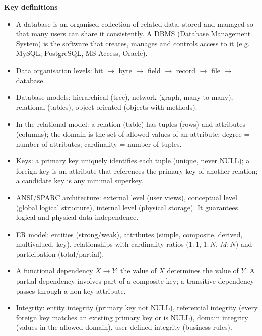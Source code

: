 \documentclass[11pt]{article}
\newcommand{\cle}[1]{{\popxbold\color{popdark}#1}}
\begin{document}
\begin{bilan}
\textbf{Key definitions}
\begin{itemize}
\item A \cle{database} is an organised collection of related data, stored and managed so that many users can share it consistently. A \cle{DBMS} (Database Management System) is the software that creates, manages and controls access to it (e.g. MySQL, PostgreSQL, MS Access, Oracle).
\item Data organisation levels: \cle{bit} $\rightarrow$ \cle{byte} $\rightarrow$ \cle{field} $\rightarrow$ \cle{record} $\rightarrow$ \cle{file} $\rightarrow$ \cle{database}.
\item Database models: \cle{hierarchical} (tree), \cle{network} (graph, many-to-many), \cle{relational} (tables), \cle{object-oriented} (objects with methods).
\item In the \cle{relational model}: a \cle{relation} (table) has \cle{tuples} (rows) and \cle{attributes} (columns); the \cle{domain} is the set of allowed values of an attribute; \cle{degree} = number of attributes; \cle{cardinality} = number of tuples.
\item Keys: a \cle{primary key} uniquely identifies each tuple (unique, never NULL); a \cle{foreign key} is an attribute that references the primary key of another relation; a \cle{candidate key} is any minimal superkey.
\item \cle{ANSI/SPARC architecture}: \cle{external level} (user views), \cle{conceptual level} (global logical structure), \cle{internal level} (physical storage). It guarantees \cle{logical} and \cle{physical data independence}.
\item \cle{ER model}: entities (strong/weak), attributes (simple, composite, derived, multivalued, key), relationships with cardinality ratios ($1{:}1$, $1{:}N$, $M{:}N$) and participation (total/partial).
\item A \cle{functional dependency} $X \rightarrow Y$: the value of $X$ determines the value of $Y$. A \cle{partial dependency} involves part of a composite key; a \cle{transitive dependency} passes through a non-key attribute.
\item \cle{Integrity}: \cle{entity integrity} (primary key not NULL), \cle{referential integrity} (every foreign key matches an existing primary key or is NULL), \cle{domain integrity} (values in the allowed domain), \cle{user-defined integrity} (business rules).
\end{itemize}


\end{bilan}
\end{document}
